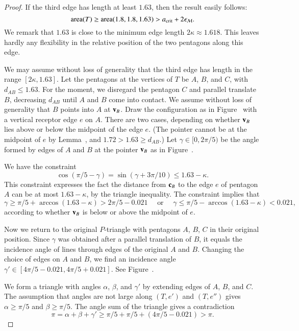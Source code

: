 \begin{proof}  
  If the third edge has length at least $1.63$, then the result easily
  follows:
\[
{\operatorname{area}}(T) \ge {\operatorname{area}}(1.8,1.8,1.63) > a_\text{crit} + 2\epsilon_{\mathcal M}.
\]
We remark that $1.63$ is close to the minimum edge length
$2\kappa\approx 1.618$.  This leaves hardly any flexibility in the
relative position of the two pentagons along this edge.

We may assume without loss of generality that the third edge has
length in the range $[2\kappa,1.63]$.  Let the pentagons at the
vertices of $T$ be $A$, $B$, and $C$, with $d_{AB}\le 1.63$.  For the
moment, we disregard the pentagon $C$ and parallel translate $B$,
decreasing $d_{AB}$ until $A$ and $B$ come into contact.  We assume
without loss of generality that $B$ points into $A$ at ${\mathbf v}_B$.  Draw
the configuration as in Figure~ with a vertical
receptor edge $e$ on $A$.  There are two cases, depending on whether
${\mathbf v}_B$ lies above or below the midpoint of the edge $e$.  (The pointer
cannot be at the midpoint of $e$ by Lemma~, and
$1.72 > 1.63 \ge d_{AB}$.)  Let $\gamma\in[0,2\pi/5)$ be the angle
formed by edges of $A$ and $B$ at the pointer ${\mathbf v}_B$ as in
Figure~.

We have the constraint
\[
\cos(\pi/5 - \gamma) =\sin(\gamma+3\pi/10) \le 1.63 - \kappa.
\]
This constraint expresses the fact the distance from ${\mathbf c}_B$ to the
edge $e$ of pentagon $A$ can be at most $1.63-\kappa$, by the triangle
inequality.  The constraint implies that
\[
\gamma \ge \pi/5 +
\arccos (1.63-\kappa) > 2\pi/5 - 0.021\quad \text{ or }\quad
%
\gamma\le \pi/5 - \arccos(1.63-\kappa) < 0.021,
\]
according to whether ${\mathbf v}_B$ is below or above the midpoint of $e$.

Now we return to the original $P$-triangle with pentagons $A$, $B$,
$C$ in their original position.  Since $\gamma$ was obtained after a
parallel translation of $B$, it equals the incidence angle of lines
through edges of the original $A$ and $B$.  Changing the choice of
edges on $A$ and $B$, we find an incidence angle  $\gamma' \in
[4\pi/5-0.021,4\pi/5+0.021]$.  See Figure~.

We form a triangle with angles $\alpha$, $\beta$, and $\gamma'$ by
extending edges of $A$, $B$, and $C$.  The assumption that angles are
not large along $(T,e')$ and $(T,e'')$ gives $\alpha\ge \pi/5$ and
$\beta\ge \pi/5$.  The angle sum of the triangle gives a contradiction
\[
\pi=\alpha+\beta+\gamma' 
\ge  \pi/5 + \pi/5 + (4\pi/5 - 0.021) > \pi.
\]
\end{proof}


